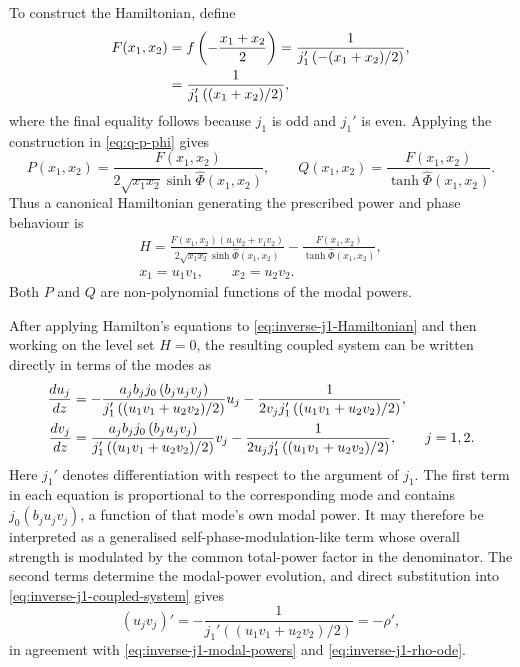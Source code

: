 \documentclass[11pt,a4paper]{article}
\numberwithin{equation}{section}
\begin{document}
To construct the Hamiltonian, define
\begin{align}
    F(x_1,x_2)
    &=f\left(-\frac{x_1+x_2}{2}\right)
    =\frac{1}{j_1'\left(-(x_1+x_2)/2\right)}, \notag \\
    &=\frac{1}{j_1'\left((x_1+x_2)/2\right)}, \label{eq:inverse-j1-F}
\end{align}
where the final equality follows because $j_1$ is odd and $j_1'$ is even.
Applying the construction in \eqref{eq:q-p-phi} gives
\begin{equation}
    P(x_1,x_2)
    =\frac{F(x_1,x_2)}{2\sqrt{x_1x_2}\sinh\widehat{\Phi}(x_1,x_2)},
    \qquad
    Q(x_1,x_2)
    =\frac{F(x_1,x_2)}{\tanh\widehat{\Phi}(x_1,x_2)}. \label{eq:inverse-j1-P-Q}
\end{equation}
Thus a canonical Hamiltonian generating the prescribed power and phase behaviour is
\begin{multline}
    H
    =\frac{F(x_1,x_2)(u_1u_2+v_1v_2)}
    {2\sqrt{x_1x_2}\sinh\widehat{\Phi}(x_1,x_2)}
    -\frac{F(x_1,x_2)}{\tanh\widehat{\Phi}(x_1,x_2)}, \\
    x_1=u_1v_1,
    \qquad
    x_2=u_2v_2. \label{eq:inverse-j1-Hamiltonian}
\end{multline}
Both $P$ and $Q$ are non-polynomial functions of the modal powers.

After applying Hamilton's equations to \eqref{eq:inverse-j1-Hamiltonian} and then working on the level set $H=0$, the resulting coupled system can be written directly in terms of the modes as
\begin{align}
    \frac{du_j}{dz}
    &=-\frac{a_jb_jj_0\left(b_ju_jv_j\right)}
    {j_1'\left((u_1v_1+u_2v_2)/2\right)}u_j
    -\frac{1}
    {2v_jj_1'\left((u_1v_1+u_2v_2)/2\right)}, \notag \\
    \frac{dv_j}{dz}
    &=\frac{a_jb_jj_0\left(b_ju_jv_j\right)}
    {j_1'\left((u_1v_1+u_2v_2)/2\right)}v_j
    -\frac{1}
    {2u_jj_1'\left((u_1v_1+u_2v_2)/2\right)},
    \qquad j=1,2. \label{eq:inverse-j1-coupled-system}
\end{align}
Here $j_1'$ denotes differentiation with respect to the argument of $j_1$.
The first term in each equation is proportional to the corresponding mode and contains $j_0(b_ju_jv_j)$, a function of that mode's own modal power.
It may therefore be interpreted as a generalised self-phase-modulation-like term whose overall strength is modulated by the common total-power factor in the denominator.
The second terms determine the modal-power evolution, and direct substitution into \eqref{eq:inverse-j1-coupled-system} gives
\begin{equation}
    (u_jv_j)'=-\frac{1}{j_1'\left((u_1v_1+u_2v_2)/2\right)}=-\rho',
\end{equation}
in agreement with \eqref{eq:inverse-j1-modal-powers} and \eqref{eq:inverse-j1-rho-ode}.
\end{document}
